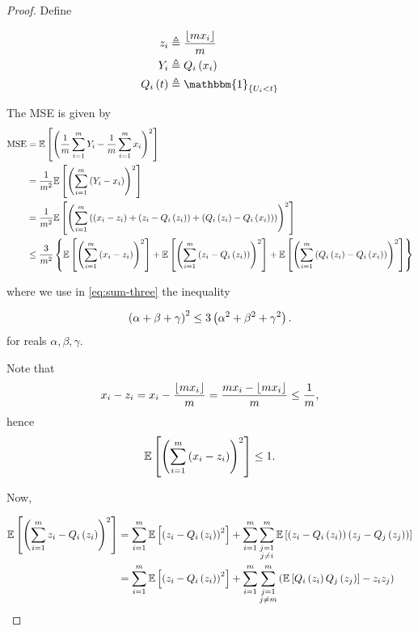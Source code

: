 \documentclass[twoside]{article}
\begin{document}
\begin{proof}
    Define

    \begin{align}
        z_i &\triangleq \frac{\floor{mx_i}}{m} \label{eq:zi-def} \\
        Y_i &\triangleq Q_i\brak{x_i} \label{eq:Yi-qi-def} \\
        Q_i\brak{t} &\triangleq \mathbbm{1}_{\cbrak{U_i<{t}}} \label{eq:Qi-def}
    \end{align}

    The MSE is given by
    \begin{align}
        \mathrm{MSE} &= \mathbb{E}\left[ \left(\frac{1}{m}\sum_{i=1}^mY_i - \frac{1}{m}\sum_{i=1}^mx_i\right)^2 \right] \\
                     &= \frac{1}{m^2}\mathbb{E}\left[ \left(\sum_{i=1}^m\left(Y_i-x_i\right)\right)^2 \right] \\
                     &= \frac{1}{m^2}\mathbb{E}\left[ \left(\sum_{i=1}^m\left(\left(x_i-z_i\right)+\left(z_i-Q_i\left(z_i\right)\right)+\left(Q_i\left(z_i\right)-Q_i\left(x_i\right)\right)\right)\right)^2 \right] \label{eq:sum-three} \\
                     &\le \frac{3}{m^2}\left\{\mathbb{E}\left[ \left(\sum_{i=1}^m\left(x_i-z_i\right)\right)^2 \right]+\mathbb{E}\left[ \left(\sum_{i=1}^m\left(z_i-Q_i\left(z_i\right)\right)\right)^2 \right]+\mathbb{E}\left[ \left(\sum_{i=1}^m\left(Q_i\left(z_i\right)-Q_i\left(x_i\right)\right)\right)^2 \right]\right\}
    \end{align}

    where we use in \eqref{eq:sum-three} the inequality

    \begin{equation}
        \left(\alpha+\beta+\gamma\right)^2 \le 3\left(\alpha^2+\beta^2+\gamma^2\right).
        \label{eq:sum-three-ineq}
    \end{equation}
    for reals \(\alpha,\beta,\gamma\).

    Note that
    \begin{equation}
        x_i-z_i = x_i - \frac{\lfloor mx_i\rfloor}{m} = \frac{mx_i - \lfloor mx_i\rfloor}{m} \le \frac{1}{m},
    \end{equation}
    hence
    \begin{equation}
        \mathbb{E}\left[ \left(\sum_{i=1}^m\left(x_i-z_i\right)\right)^2 \right] \le 1.
        \label{eq:term-1}
    \end{equation}

    Now,

    \begin{align}
        \mathbb{E}\left[ \left(\sum_{i=1}^mz_i-Q_i\left(z_i\right)\right)^2 \right] &= \sum_{i=1}^m\mathbb{E}\left[ \left(z_i-Q_i\left(z_i\right)\right)^2 \right] + \sum_{i=1}^{m}\sum_{\substack{j=1\\j\neq i}}^{m}\mathbb{E}\left[ \left(z_i-Q_i\left(z_i\right)\right)\left(z_j-Q_j\left(z_j\right)\right) \right] \\
                                                      &= \sum_{i=1}^m\mathbb{E}\left[ \left(z_i-Q_i\left(z_i\right)\right)^2 \right] + \sum_{i=1}^m\sum_{\substack{j=1\\j\neq m}}^m\left(\mathbb{E}\left[ Q_i\left(z_i\right)Q_j\left(z_j\right) \right]-z_iz_j\right)
                                                      \label{eq:term-2-solve}
    \end{align}


\end{proof}
\end{document}
